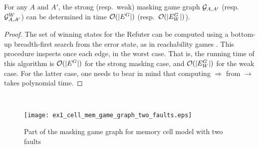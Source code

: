\begin{thm}\label{th:game-determined}
  For any $A$ and $A'$, the strong (resp.\ weak) masking game graph
  $\mathcal{G}_{A, A'}$ (resp.\ $\mathcal{G}^W_{A,A'}$)  can be
  determined in time $\mathcal{O}(|E^G|)$ (resp.\ $\mathcal{O}(|E_W^G|)$).
\end{thm}
\begin{proof}
	The set of winning states for the Refuter can be computed using a bottom-up breadth-first search from the error state, as in reachability games \cite{Jurd11}. 
This procedure inspects once each edge, in the worst case. That is, the running time of this algorithm is $\mathcal{O}(|E^G|)$ for 
the strong masking case, and $\mathcal{O}(|E_W^G|)$ for the weak case. For the latter case, one needs to bear in mind that computing  
$\Rightarrow$ from $\rightarrow$ takes polynomial time.
\qedhere
\end{proof} \\
\begin{figure} [h]
\begin{center}
    \texttt{[image: ex1\_cell\_mem\_game\_graph\_two\_faults.eps]} 
    \caption{Part of the masking game graph for memory cell model with two faults}
    \label{figure:exam_2_mem_cell_gg_two_faults}
\end{center}
\end{figure}

